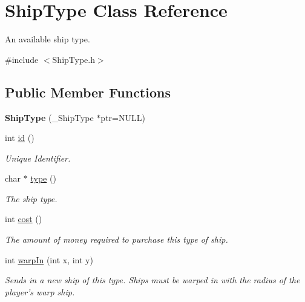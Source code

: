 \hypertarget{classShipType}{\section{\-Ship\-Type \-Class \-Reference}
\label{classShipType}
}


\-An available ship type.  




{\ttfamily \#include $<$\-Ship\-Type.\-h$>$}

\subsection*{\-Public \-Member \-Functions}
\begin{DoxyCompactItemize}
\item 
\hypertarget{classShipType_a7a6f3778c32ac4043efc6b05e592cc00}{{\bfseries \-Ship\-Type} (\-\_\-\-Ship\-Type $\ast$ptr=\-N\-U\-L\-L)}\label{classShipType_a7a6f3778c32ac4043efc6b05e592cc00}

\item 
\hypertarget{classShipType_a5f37f1b0497374a5dbabf83488ff5afa}{int \hyperlink{classShipType_a5f37f1b0497374a5dbabf83488ff5afa}{id} ()}\label{classShipType_a5f37f1b0497374a5dbabf83488ff5afa}

\begin{DoxyCompactList}\small\item\em \-Unique \-Identifier. \end{DoxyCompactList}\item 
\hypertarget{classShipType_af137be3fc3f59c5a20ed00efb0c05779}{char $\ast$ \hyperlink{classShipType_af137be3fc3f59c5a20ed00efb0c05779}{type} ()}\label{classShipType_af137be3fc3f59c5a20ed00efb0c05779}

\begin{DoxyCompactList}\small\item\em \-The ship type. \end{DoxyCompactList}\item 
\hypertarget{classShipType_ac7b4279e97f3902772c6736ac8fff6ec}{int \hyperlink{classShipType_ac7b4279e97f3902772c6736ac8fff6ec}{cost} ()}\label{classShipType_ac7b4279e97f3902772c6736ac8fff6ec}

\begin{DoxyCompactList}\small\item\em \-The amount of money required to purchase this type of ship. \end{DoxyCompactList}\item 
\hypertarget{classShipType_aa3e4c4be78123f472f2bc5e75758ceb0}{int \hyperlink{classShipType_aa3e4c4be78123f472f2bc5e75758ceb0}{warp\-In} (int x, int y)}\label{classShipType_aa3e4c4be78123f472f2bc5e75758ceb0}

\begin{DoxyCompactList}\small\item\em \-Sends in a new ship of this type. \-Ships must be warped in with the radius of the player's warp ship. \end{DoxyCompactList}\end{DoxyCompactItemize}

